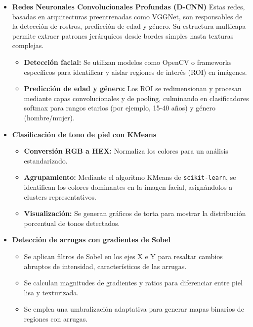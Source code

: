\begin{itemize}
    \item \textbf{Redes Neuronales Convolucionales Profundas (D-CNN)}
    Estas redes, basadas en arquitecturas preentrenadas como VGGNet, son responsables de la detección de rostros, predicción de edad y género. Su estructura multicapa permite extraer patrones jerárquicos desde bordes simples hasta texturas complejas.
	\begin{itemize}
		\item \textbf{Detección facial:} Se utilizan modelos como OpenCV o frameworks específicos para identificar y aislar regiones de interés (ROI) en imágenes.
		\item \textbf{Predicción de edad y género:} Los ROI se redimensionan y procesan mediante capas convolucionales y de pooling, culminando en clasificadores softmax para rangos etarios (por ejemplo, 15-40 años) y género (hombre/mujer).
	\end{itemize}
	
	\item \textbf{Clasificación de tono de piel con KMeans}
	\begin{itemize}
			\item \textbf{Conversión RGB a HEX:} Normaliza los colores para un análisis estandarizado.
			\item \textbf{Agrupamiento:} Mediante el algoritmo KMeans de \texttt{scikit-learn}, se identifican los colores dominantes en la imagen facial, asignándolos a clusters representativos.
			\item \textbf{Visualización:} Se generan gráficos de torta para mostrar la distribución porcentual de tonos detectados.
	\end{itemize}	

	\item \textbf{Detección de arrugas con gradientes de Sobel}
	\begin{itemize}
			\item Se aplican filtros de Sobel en los ejes X e Y para resaltar cambios abruptos de intensidad, característicos de las arrugas.
			\item Se calculan magnitudes de gradientes y ratios para diferenciar entre piel lisa y texturizada.
			\item Se emplea una umbralización adaptativa para generar mapas binarios de regiones con arrugas.
	\end{itemize}	

\end{itemize}


